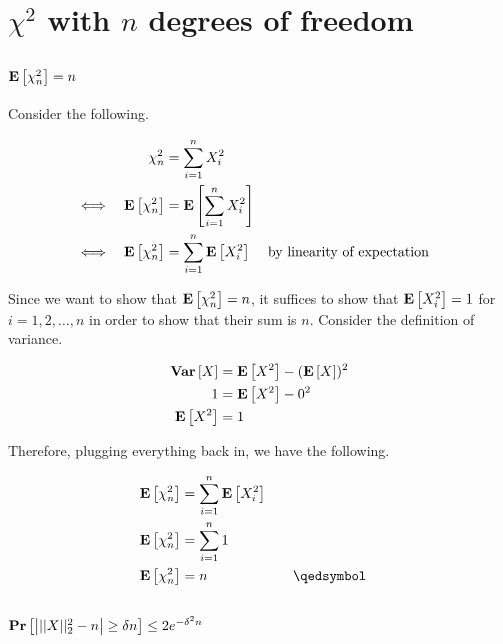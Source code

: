 \chapter{$\chi^2$ with $n$ degrees of freedom}

\section{$\mathbf{E}\left[\chi_n^2\right] = n$}

Consider the following.

\begin{equation*}
\begin{aligned}
	&& \chi^2_n &= \sum_{i=1}^n X_i^2 \\
	\iff && \mathbf{E}\left[\chi^2_n\right] &= \mathbf{E}\left[\sum_{i=1}^n X_i^2\right] \\
	\iff && \mathbf{E}\left[\chi^2_n\right] &= \sum_{i=1}^n \mathbf{E}\left[X_i^2\right] && \text{by linearity of expectation}
\end{aligned}
\end{equation*}

Since we want to show that $\mathbf{E}\left[\chi^2_n\right] = n$, it suffices to show that $\mathbf{E}\left[X_i^2\right] = 1$ for $i = 1, 2, \ldots, n$ in order to show that their sum is $n$. Consider the definition of variance.

\begin{equation*}
\begin{aligned}
	\mathbf{Var}\left[X\right] &= \mathbf{E}\left[X^2\right] - (\mathbf{E}\left[X\right])^2 \\
	1 &= \mathbf{E}\left[X^2\right] - 0^2 \\
	\mathbf{E}\left[X^2\right] &= 1
\end{aligned}
\end{equation*}

Therefore, plugging everything back in, we have the following.

\begin{equation*}
\begin{aligned}
	\ex{\chi^2_n} &= \sum_{i=1}^n \ex{X_i^2} \\
	\ex{\chi^2_n} &= \sum_{i=1}^n 1 \\
	\ex{\chi^2_n} &= n &&\quad\qedsymbol \\
\end{aligned}
\end{equation*}

\section{$\mathbf{Pr}\left[\left|||X||_2^2 - n\right| \geq \delta n\right] \leq 2e^{-\delta^2n}$}

